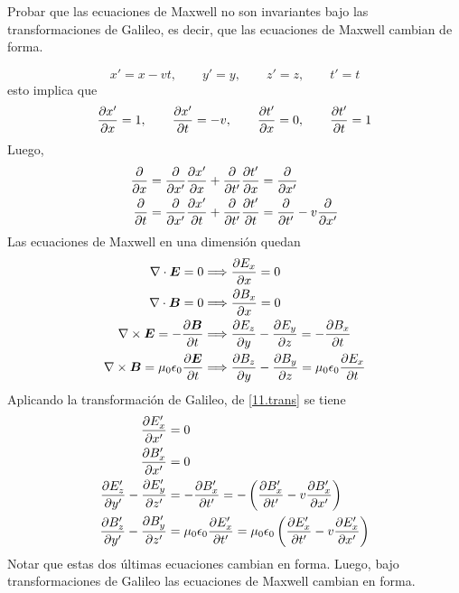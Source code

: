\begin{ej}
	Probar que las ecuaciones de Maxwell no son invariantes bajo las transformaciones de Galileo, es decir, que las ecuaciones de Maxwell cambian de forma.
\end{ej}
\begin{sol}
	\begin{equation}
  x'=x-vt,\qquad y'=y,\qquad z'=z,\qquad t'=t
\end{equation}
esto implica que
\begin{equation}
  \pdv{x'}{x}=1,\qquad \pdv{x'}{t}=-v,\qquad \pdv{t'}{x}=0,\qquad \pdv{t'}{t}=1
\end{equation}
Luego,
\begin{equation}\label{11.trans}
\begin{split}
  \pdv{x}&=\pdv{x'}\pdv{x'}{x}+\pdv{t'}\pdv{t'}{x}=\pdv{x'}\\
  \pdv{t}&=\pdv{x'}\pdv{x'}{t}+\pdv{t'}\pdv{t'}{t}=\pdv{t'}-v\pdv{x'}
 \end{split}
\end{equation}
Las ecuaciones de Maxwell en una dimensión quedan
\begin{align}
  \nabla\cdot\vb*{E}=0&\Longrightarrow \pdv{E_x}{x}=0\\
  \nabla\cdot\vb*{B}=0&\Longrightarrow \pdv{B_x}{x}=0\\
  \nabla\times \vb*{E}=-\pdv{\vb*{B}}{t}&\Longrightarrow \pdv{E_z}{y}-\pdv{E_y}{z}=-\pdv{B_x}{t}\\
  \nabla\times \vb*{B}=\mu_0\epsilon_0\pdv{\vb*{E}}{t}&\Longrightarrow \pdv{B_z}{y}-\pdv{B_y}{z}=\mu_0\epsilon_0\pdv{E_x}{t}\\
\end{align}
Aplicando la transformación de Galileo, de \eqref{11.trans} se tiene
\begin{align}
  \pdv{E_x'}{x'}&=0\\
  \pdv{B_x'}{x'}&=0\\
  \pdv{E_z'}{y'}-\pdv{E_y'}{z'}&=-\pdv{B_x'}{t'}=-\left(\pdv{B_x'}{t'}-v\pdv{B_x'}{x'}\right)\\
  \pdv{B_z'}{y'}-\pdv{B_y'}{z'}&=\mu_0\epsilon_0\pdv{E_x'}{t'}=\mu_0\epsilon_0\left(\pdv{E_x'}{t'}-v\pdv{E_x'}{x'}\right)
\end{align}
Notar que estas dos últimas ecuaciones cambian en forma. Luego, bajo transformaciones de Galileo las ecuaciones de Maxwell cambian en forma.
\end{sol}

